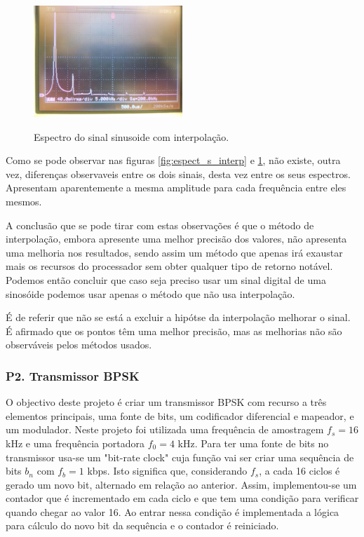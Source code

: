 \documentclass[11pt]{article}
\begin{document}
\begin{figure}[H]
	\centering
	\label{fig:espect_c_interp}
	\includegraphics[width=0.5\textwidth]{./P1-8_espect_c_interp}~\\
	\caption{Espectro do sinal sinusoide com interpolação.}
\end{figure}

Como se pode observar nas figuras \ref{fig:espect_s_interp} e \ref{fig:espect_c_interp}, não existe, outra vez, diferenças observaveis entre os dois sinais, desta vez entre os seus espectros. Apresentam aparentemente a mesma amplitude para cada frequência entre eles mesmos.

A conclusão que se pode tirar com estas observações é que o método de interpolação, embora apresente uma melhor precisão dos valores, não apresenta uma melhoria nos resultados, sendo assim um método que apenas irá exaustar mais os recursos do processador sem obter qualquer tipo de retorno notável. Podemos então concluir que caso seja preciso usar um sinal digital de uma sinosóide podemos usar apenas o método que não usa interpolação.

É de referir que não se está a excluir a hipótse da interpolação melhorar o sinal. É afirmado que os pontos têm uma melhor precisão, mas as melhorias não são observáveis pelos métodos usados.

\subsubsection{P2. Transmissor BPSK}

O objectivo deste projeto é criar um transmissor BPSK com recurso a três elementos principais, uma fonte de bits, um codificador diferencial e mapeador, e um modulador.
Neste projeto foi utilizada uma frequência de amostragem $f_s=16$ kHz e uma frequência portadora $f_0=4$ kHz.
\vfill
Para ter uma fonte de bits no transmissor usa-se um "bit-rate clock" cuja função vai ser criar uma sequência de bits $ b_n $ com $f_b=1$ kbps. Isto significa que, considerando $f_s$, a cada 16 ciclos é gerado um novo bit, alternado em relação ao anterior. Assim, implementou-se um contador que é incrementado em cada ciclo  e que tem uma condição para verificar quando chegar ao valor 16. Ao entrar nessa condição é implementada a lógica para cálculo do novo bit da sequência e o contador é reiniciado.
\end{document}
